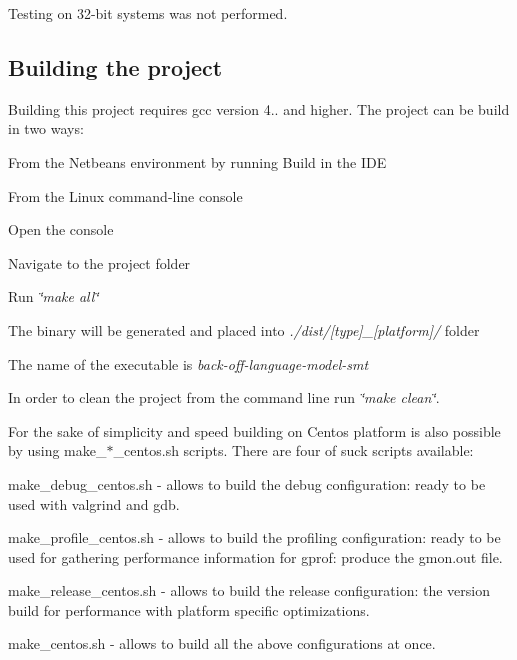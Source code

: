 Testing on 32-\/bit systems was not performed.

\subsection*{Building the project}

Building this project requires gcc version 4.. and higher. The project can be build in two ways\+:


\begin{DoxyItemize}
\item From the Netbeans environment by running Build in the I\+D\+E
\item From the Linux command-\/line console
\begin{DoxyItemize}
\item Open the console
\item Navigate to the project folder
\item Run {\itshape \char`\"{}make all\char`\"{}}
\item The binary will be generated and placed into {\itshape ./dist/\mbox{[}type\mbox{]}\+\_\+\mbox{[}platform\mbox{]}/} folder
\item The name of the executable is {\itshape back-\/off-\/language-\/model-\/smt}
\end{DoxyItemize}
\end{DoxyItemize}

In order to clean the project from the command line run {\itshape \char`\"{}make clean\char`\"{}}.

For the sake of simplicity and speed building on Centos platform is also possible by using make\+\_\+$\ast$\+\_\+centos.sh scripts. There are four of suck scripts available\+:


\begin{DoxyItemize}
\item make\+\_\+debug\+\_\+centos.\+sh -\/ allows to build the debug configuration\+: ready to be used with valgrind and gdb.
\item make\+\_\+profile\+\_\+centos.\+sh -\/ allows to build the profiling configuration\+: ready to be used for gathering performance information for gprof\+: produce the gmon.\+out file.
\item make\+\_\+release\+\_\+centos.\+sh -\/ allows to build the release configuration\+: the version build for performance with platform specific optimization\textquotesingle{}s.
\item make\+\_\+centos.\+sh -\/ allows to build all the above configurations at once.
\end{DoxyItemize}


